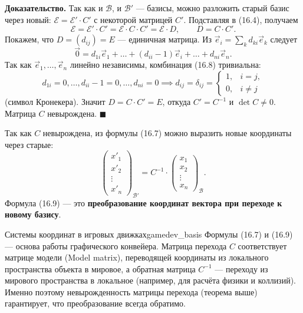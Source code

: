 \documentclass[12pt,a4paper]{article}
\newenvironment{myproof}{\noindent\textbf{Доказательство.}}{\hfill$\blacksquare$}
\begin{document}
\begin{myproof}
  Так как и $\mathcal{B}$, и $\mathcal{B}'$ --- базисы, можно
  разложить старый базис через новый: $\mathcal{E} = \mathcal{E}'
  \cdot C'$ с некоторой матрицей $C'$. Подставляя в (16.4), получаем
  \[
    \mathcal{E} = \mathcal{E}' \cdot C' = \mathcal{E} \cdot C \cdot
    C' = \mathcal{E} \cdot D, \qquad D = C \cdot C'.
  \]
  Покажем, что $D = (d_{ij}) = E$ --- единичная матрица. Из
  $\vec{e}_i = \sum_{k} d_{ki}\vec{e}_k$ следует
  \begin{equation}
    \vec{0} = d_{1i}\vec{e}_1 + \dots + (d_{ii} - 1)\vec{e}_i + \dots
    + d_{ni}\vec{e}_n.
    \tag{16.8}
  \end{equation}
  Так как $\vec{e}_1, \dots, \vec{e}_n$ линейно независимы,
  комбинация (16.8) тривиальна:
  \[
    d_{1i} = 0, \dots, d_{ii} - 1 = 0, \dots, d_{ni} = 0
    \implies d_{ij} = \delta_{ij} =
    \begin{cases} 1, & i = j, \\ 0, & i \neq j
    \end{cases}
  \]
  (символ Кронекера). Значит $D = C \cdot C' = E$, откуда $C' =
  C^{-1}$ и $\det C \neq 0$. Матрица $C$ невырождена.
\end{myproof}

Так как $C$ невырождена, из формулы (16.7) можно выразить новые
координаты через старые:
\begin{equation}
  \begin{pmatrix} x'_1 \\ x'_2 \\ \vdots \\ x'_n
  \end{pmatrix}_{\mathcal{B}'}
  = C^{-1} \cdot
  \begin{pmatrix} x_1 \\ x_2 \\ \vdots \\ x_n
  \end{pmatrix}_{\mathcal{B}}.
  \tag{16.9}
\end{equation}
Формула (16.9) --- это \textbf{преобразование координат вектора при
переходе к новому базису}.

\begin{remarkIT}{Системы координат в игровых движках}{gamedev_basis}
  Формулы (16.7) и (16.9) --- основа работы графического конвейера.
  Матрица перехода $C$ соответствует матрице модели (Model matrix),
  переводящей координаты из локального пространства объекта в мировое,
  а обратная матрица $C^{-1}$ --- переходу из мирового пространства в
  локальное (например, для расчёта физики и коллизий). Именно поэтому
  невырожденность матрицы перехода (теорема выше) гарантирует, что
  преобразование всегда обратимо.
\end{remarkIT}
\end{document}
